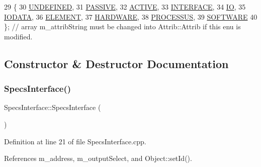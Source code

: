 \begin{DoxyCode}
29                 \{
30     \hyperlink{classAttrib_a69e171d7cc6417835a5a306d3c764235a3a8da2ab97dda18aebab196fe4100531}{UNDEFINED},
31     \hyperlink{classAttrib_a69e171d7cc6417835a5a306d3c764235a2bfb2af57b87031d190a05fe25dd92ed}{PASSIVE},
32     \hyperlink{classAttrib_a69e171d7cc6417835a5a306d3c764235a3b1fec929c0370d1436f2f06e298fb0d}{ACTIVE},
33     \hyperlink{classAttrib_a69e171d7cc6417835a5a306d3c764235aa27c16b480a369ea4d18b07b2516bbc7}{INTERFACE},
34     \hyperlink{classAttrib_a69e171d7cc6417835a5a306d3c764235a1420a5b8c0540b2af210b6975eded7f9}{IO},
35     \hyperlink{classAttrib_a69e171d7cc6417835a5a306d3c764235a0af3b0d0ac323c1704e6c69cf90add28}{IODATA},
36     \hyperlink{classAttrib_a69e171d7cc6417835a5a306d3c764235a7788bc5dd333fd8ce18562b269c9dab1}{ELEMENT},
37     \hyperlink{classAttrib_a69e171d7cc6417835a5a306d3c764235a61ceb22149f365f1780d18f9d1459423}{HARDWARE},
38     \hyperlink{classAttrib_a69e171d7cc6417835a5a306d3c764235a75250e29692496e73effca2c0330977f}{PROCESSUS},
39     \hyperlink{classAttrib_a69e171d7cc6417835a5a306d3c764235a103a67cd0b8f07ef478fa45d4356e27b}{SOFTWARE} 
40   \}; \textcolor{comment}{// array m\_attribString must be changed into Attrib::Attrib if this enu is modified. }
\end{DoxyCode}


\subsection{Constructor \& Destructor Documentation}
\mbox{\label{classSpecsInterface_a33b267de6a6447965f068adea3aba138}} 
\subsubsection{\texorpdfstring{Specs\+Interface()}{SpecsInterface()}}
{\footnotesize\ttfamily Specs\+Interface\+::\+Specs\+Interface (\begin{DoxyParamCaption}{ }\end{DoxyParamCaption})}



Definition at line 21 of file Specs\+Interface.\+cpp.



References m\+\_\+address, m\+\_\+output\+Select, and Object\+::set\+Id().


